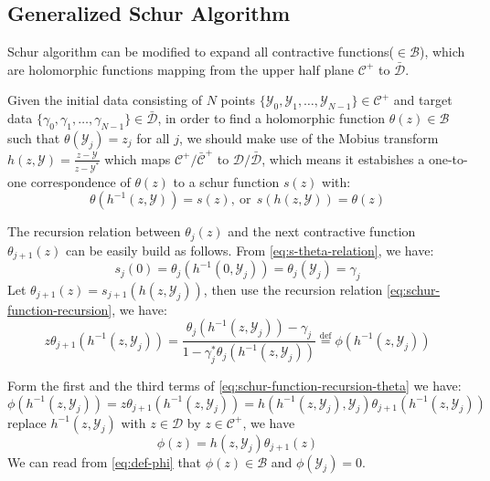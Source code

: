 \documentclass[
	preprint,%
	aps,
	prb,
	showpacs,	
	amsmath, amssymb]{revtex4-2}
\DeclareRobustCommand{\+}{\hstretch{1.25} {\boldsymbol {\mathrel{+}}}}
\newcommand{\Y}{ {\mathcal{Y}} }
\newcommand{\C}{ {\mathcal{C}} }
\newcommand{\Cbar}{ {\bar{\mathcal{C}}} }
\newcommand{\D}{ {\mathcal{D}} }
\newcommand{\Dbar}{ {\bar{\mathcal{D}}} }
\newcommand{\B}{ {\mathcal{B}} }
\begin{document}
\subsection{Generalized Schur Algorithm}
\label{subsec:generalized-schur-algorithm}

Schur algorithm can be modified to expand all contractive 
functions($\in \B$)\cite{adamyan2003reconstruction}, which are
holomorphic functions mapping from the upper half plane $\C^+$ 
to $\Dbar$.

Given the initial data consisting of $N$ points 
$\{\Y_0, \Y_1, \dots ,\Y_{N-1}\} \in \C^+$ and target data
$\{\gamma_0, \gamma_1, \dots ,\gamma_{N-1}\} \in \Dbar$, 
in order to find a holomorphic function $\theta(z) \in \B$ 
such that $\theta(\Y_j) = z_j$ for all $j$, we should make use 
of the Mobius transform $h(z, \Y)  = \frac{z - \Y}{z - \Y^*}$ 
which maps $\C^+/\Cbar^+$ to $\D/\Dbar$, 
which means it estabishes a one-to-one correspondence of $\theta(z)$ 
to a schur function $s(z)$ with:
\begin{equation}\label{eq:s-theta-relation}
	\theta(h^{-1}(z,\Y)) = s(z),\ \mathrm{or} \ \
	s(h(z,\Y)) = \theta(z)
\end{equation}

The recursion relation between $\theta_j(z)$ and the next contractive 
function $\theta_{j+1}(z)$ can be easily build as follows. From 
\cref{eq:s-theta-relation}, we have:
\begin{equation}\label{eq:s-theta-relation-z0}
	s_j(0) = \theta_j(h^{-1}(0,\Y_j)) = \theta_j(\Y_j) = \gamma_j
\end{equation}
Let $\theta_{j+1}(z) = s_{j+1}(h(z,\Y_j))$,
then use the recursion relation 
\cref{eq:schur-function-recursion}, we have: 
\begin{equation}\label{eq:schur-function-recursion-theta}
	z\theta_{j+1}(h^{-1}(z,\Y_j)) 
	= \frac{\theta_j(h^{-1}(z,\Y_j)) 
		- \gamma_j}{1 - \gamma_j^* \theta_j(h^{-1}(z,\Y_j))}
	\overset{\mathrm{def}}{=} \phi(h^{-1}(z,\Y_j))
\end{equation}

Form the first and the third terms of \cref{eq:schur-function-recursion-theta}
we have:
\begin{equation}
	\phi(h^{-1}(z,\Y_j)) = z\theta_{j+1}(h^{-1}(z,\Y_j)) 
	=h(h^{-1}(z, \Y_j), \Y_j) \theta_{j+1}(h^{-1}(z,\Y_j)) 
\end{equation}
replace $h^{-1}(z,\Y_j)$ with $z\in\D$ by $z \in \C^+$, we have
\begin{equation}\label{eq:def-phi}
	\phi(z) =h(z, \Y_j) \theta_{j+1}(z) 
\end{equation}
We can read from \cref{eq:def-phi} that $\phi(z) \in \B$ 
and $\phi(\Y_j) = 0$.
\end{document}
